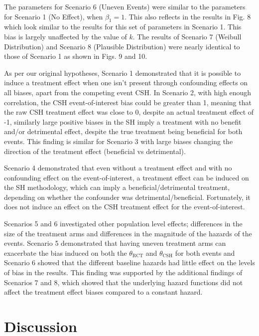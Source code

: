 \documentclass[12pt,PhD,twoside,openright]{muthesis}
\begin{document}
The parameters for Scenario 6 (Uneven Events) were similar to the parameters for Scenario 1 (No Effect), when \(\beta_1=1\). This also reflects in the results in Fig. 8 which look similar to the results for this set of parameters in Scenario 1. This bias is largely unaffected by the value of \(k\). The results of Scenario 7 (Weibull Distribution) and Scenario 8 (Plausible Distribution) were nearly identical to those of Scenario 1 as shown in Figs. 9 and 10.

As per our original hypotheses, Scenario 1 demonstrated that it is possible to induce a treatment effect when one isn't present through confounding effects on all biases, apart from the competing event CSH. In Scenario 2, with high enough correlation, the CSH event-of-interest bias could be greater than 1, meaning that the raw CSH treatment effect was close to 0, despite an actual treatment effect of -1, similarly large positive biases in the SH imply a treatment with no benefit and/or detrimental effect, despite the true treatment being beneficial for both events. This finding is similar for Scenario 3 with large biases changing the direction of the treatment effect (beneficial vs detrimental).

Scenario 4 demonstrated that even without a treatment effect and with no confounding effect on the event-of-interest, a treatment effect can be induced on the SH methodology, which can imply a beneficial/detrimental treatment, depending on whether the confounder was detrimental/beneficial. Fortunately, it does not induce an effect on the CSH treatment effect for the event-of-interest.

Scenarios 5 and 6 investigated other population level effects; differences in the size of the treatment arms and differences in the magnitude of the hazards of the events. Scenario 5 demonstrated that having uneven treatment arms can exacerbate the bias induced on both the \(\theta_{\textrm{RCT}}\) and \(\theta_{\textrm{CSH}}\) for both events and Scenario 6 showed that the different baseline hazards had little effect on the levels of bias in the results. This finding was supported by the additional findings of Scenarios 7 and 8, which showed that the underlying hazard functions did not affect the treatment effect biases compared to a constant hazard.

\hypertarget{discussion}{%
\section{Discussion}\label{discussion}}
\end{document}
